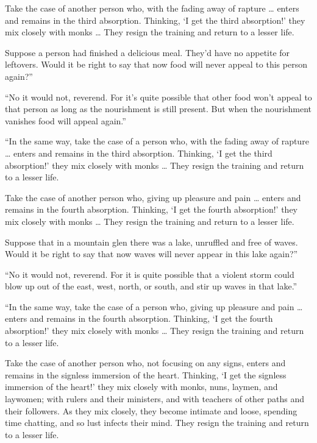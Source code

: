 \documentclass[12pt,openany]{book}%
\begin{document}
Take the case of another person who, with the fading away of rapture … enters and remains in the third absorption. Thinking, ‘I get the third absorption!’ they mix closely with monks … They resign the training and return to a lesser life. 

Suppose a person had finished a delicious meal. They’d have no appetite for leftovers. Would it be right to say that now food will never appeal to this person again?” 

“No it would not, reverend. For it’s quite possible that other food won’t appeal to that person as long as the nourishment is still present. But when the nourishment vanishes food will appeal again.” 

“In the same way, take the case of a person who, with the fading away of rapture … enters and remains in the third absorption. Thinking, ‘I get the third absorption!’ they mix closely with monks … They resign the training and return to a lesser life. 

Take the case of another person who, giving up pleasure and pain … enters and remains in the fourth absorption. Thinking, ‘I get the fourth absorption!’ they mix closely with monks … They resign the training and return to a lesser life. 

Suppose that in a mountain glen there was a lake, unruffled and free of waves. Would it be right to say that now waves will never appear in this lake again?” 

“No it would not, reverend. For it is quite possible that a violent storm could blow up out of the east, west, north, or south, and stir up waves in that lake.” 

“In the same way, take the case of a person who, giving up pleasure and pain … enters and remains in the fourth absorption. Thinking, ‘I get the fourth absorption!’ they mix closely with monks … They resign the training and return to a lesser life. 

Take the case of another person who, not focusing on any signs, enters and remains in the signless immersion of the heart. Thinking, ‘I get the signless immersion of the heart!’ they mix closely with monks, nuns, laymen, and laywomen; with rulers and their ministers, and with teachers of other paths and their followers. As they mix closely, they become intimate and loose, spending time chatting, and so lust infects their mind. They resign the training and return to a lesser life. 
\end{document}
